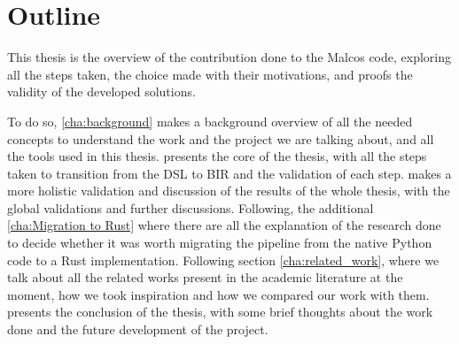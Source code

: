 \section{Outline}
This thesis is the overview of the contribution done to the Malcos code, exploring
all the steps taken, the choice made with their motivations, and proofs the validity
of the developed solutions.

To do so, \cref{cha:background} makes a background overview of all the needed
concepts to understand the work and the project we are talking about, and all the
tools used in this thesis.  presents the core of the thesis, with
all the steps taken to transition from the DSL to BIR and the validation of each
step.  makes a more holistic validation and
discussion of the results of the whole thesis, with the global validations and further
discussions. Following, the additional \cref{cha:Migration to Rust} where there are
all the explanation of the research done to decide whether it was worth migrating
the pipeline from the native Python code to a Rust implementation. Following
section \cref{cha:related_work}, where we talk about all the related works present
in the academic literature at the moment, how we took inspiration and how we
compared our work with them.  presents the conclusion of the
thesis, with some brief thoughts about the work done and the future development
of the project.